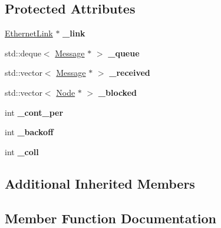 \subsection*{Protected Attributes}
\begin{DoxyCompactItemize}
\item 
\hyperlink{classEthernetLink}{Ethernet\+Link} $\ast$ {\bfseries \+\_\+link}\hypertarget{classEthernetInterface_af45c8e0836938fa227e5c961d93ef438}{}\label{classEthernetInterface_af45c8e0836938fa227e5c961d93ef438}

\item 
std\+::deque$<$ \hyperlink{classMessage}{Message} $\ast$ $>$ {\bfseries \+\_\+queue}\hypertarget{classEthernetInterface_af828c8da3f94d29e75fd6795dfe9c3b9}{}\label{classEthernetInterface_af828c8da3f94d29e75fd6795dfe9c3b9}

\item 
std\+::vector$<$ \hyperlink{classMessage}{Message} $\ast$ $>$ {\bfseries \+\_\+received}\hypertarget{classEthernetInterface_a6b62ff911e0bbaad3d47541a4b4fc45b}{}\label{classEthernetInterface_a6b62ff911e0bbaad3d47541a4b4fc45b}

\item 
std\+::vector$<$ \hyperlink{classNode}{Node} $\ast$ $>$ {\bfseries \+\_\+blocked}\hypertarget{classEthernetInterface_a300cd188830eae2065a77d46d89cbe2a}{}\label{classEthernetInterface_a300cd188830eae2065a77d46d89cbe2a}

\item 
int {\bfseries \+\_\+cont\+\_\+per}\hypertarget{classEthernetInterface_a25b27ac03d95104734a446d3566f1ca0}{}\label{classEthernetInterface_a25b27ac03d95104734a446d3566f1ca0}

\item 
int {\bfseries \+\_\+backoff}\hypertarget{classEthernetInterface_a3efe15476ab5cb5a124e36b70246e4e7}{}\label{classEthernetInterface_a3efe15476ab5cb5a124e36b70246e4e7}

\item 
int {\bfseries \+\_\+coll}\hypertarget{classEthernetInterface_ada0fc7328a66c9279574f97ad7cb4579}{}\label{classEthernetInterface_ada0fc7328a66c9279574f97ad7cb4579}

\end{DoxyCompactItemize}
\subsection*{Additional Inherited Members}


\subsection{Member Function Documentation}
